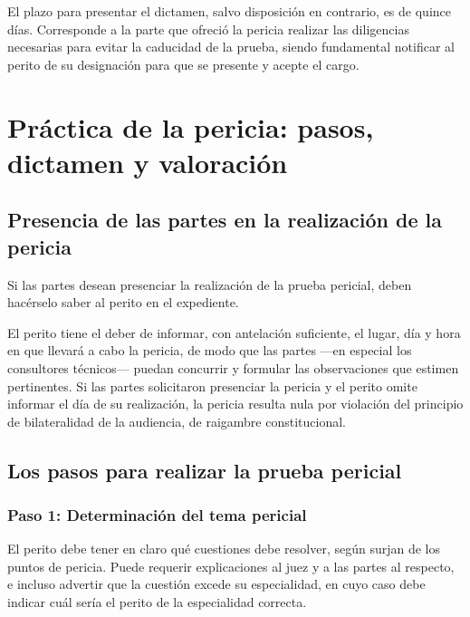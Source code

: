 \documentclass[12pt,oneside]{book}
\begin{document}
El plazo para presentar el dictamen, salvo disposición en contrario, es de quince días. Corresponde a la parte que ofreció la pericia realizar las diligencias necesarias para evitar la caducidad de la prueba, siendo fundamental notificar al perito de su designación para que se presente y acepte el cargo.

\chapter{Práctica de la pericia: pasos, dictamen y valoración}

\section{Presencia de las partes en la realización de la pericia}

Si las partes desean presenciar la realización de la prueba pericial, deben hacérselo saber al perito en el expediente.

\begin{important}
El perito tiene el deber de informar, con antelación suficiente, el lugar, día y hora en que llevará a cabo la pericia, de modo que las partes —en especial los consultores técnicos— puedan concurrir y formular las observaciones que estimen pertinentes. Si las partes solicitaron presenciar la pericia y el perito omite informar el día de su realización, la pericia resulta nula por violación del principio de bilateralidad de la audiencia, de raigambre constitucional.
\end{important}

\section{Los pasos para realizar la prueba pericial}

\subsection{Paso 1: Determinación del tema pericial}

El perito debe tener en claro qué cuestiones debe resolver, según surjan de los puntos de pericia. Puede requerir explicaciones al juez y a las partes al respecto, e incluso advertir que la cuestión excede su especialidad, en cuyo caso debe indicar cuál sería el perito de la especialidad correcta.
\end{document}
